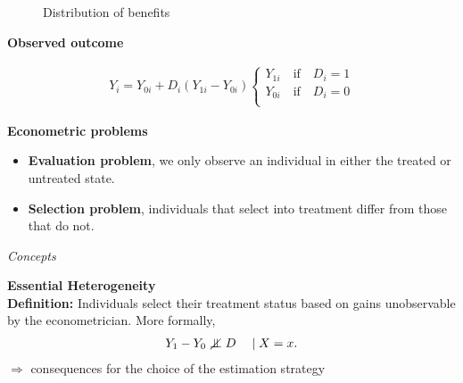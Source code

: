 \begin{frame}
\begin{figure}[htp]\centering\caption{Distribution of benefits}
\end{figure}
\end{frame}
\begin{frame}\textbf{Observed outcome}

\begin{align*}
Y_i = Y_{0i} + D_i (Y_{1i} - Y_{0i})
\begin{cases}
Y_{1i}\quad\text{if}\quad D_{i} = 1 \\
Y_{0i}\quad\text{if}\quad D_{i} = 0 \\
\end{cases}
\end{align*}

\end{frame}
\begin{frame}\textbf{Econometric problems}

\begin{itemize}\setlength\itemsep{1em}
\item \textbf{Evaluation problem}, we only observe an individual in either the treated or untreated state.
\item \textbf{Selection problem}, individuals that select into treatment differ from those that do not.
\end{itemize}

\end{frame}
\begin{frame}\begin{center}
	\LARGE\textit{Concepts}
\end{center}\end{frame}
\begin{frame}
	\textbf{Essential Heterogeneity}\\\vspace{0.5cm}
	\textbf{Definition:} Individuals select their treatment status based on
	gains unobservable by the econometrician. More formally,
	\begin{align*}
		Y_1 - Y_0 \notindep D\quad \mid X = x.
	\end{align*}
	\(\Rightarrow\) consequences for the choice of the estimation strategy
\end{frame}
